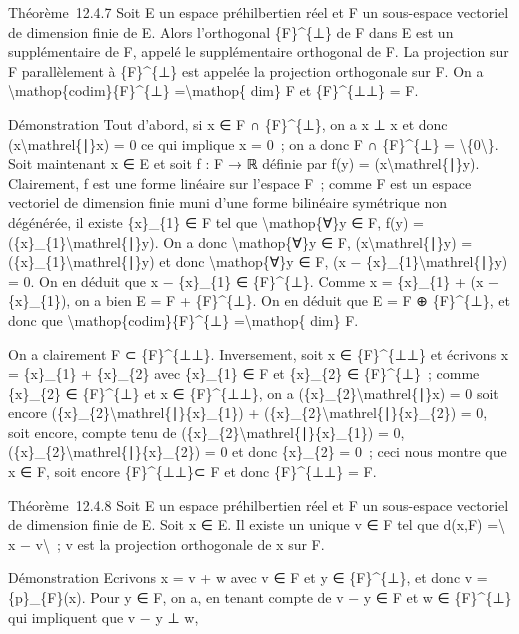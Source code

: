 \documentclass[]{article}
\begin{document}
Théorème~12.4.7 Soit E un espace préhilbertien réel et F un sous-espace
vectoriel de dimension finie de E. Alors l'orthogonal \{F\}\^{}\{⊥\} de
F dans E est un supplémentaire de F, appelé le supplémentaire orthogonal
de F. La projection sur F parallèlement à \{F\}\^{}\{⊥\} est appelée la
projection orthogonale sur F. On a
\textbackslash{}mathop\{codim\}\{F\}\^{}\{⊥\} =\textbackslash{}mathop\{
dim\} F et \{F\}\^{}\{⊥⊥\} = F.

Démonstration Tout d'abord, si x ∈ F ∩ \{F\}\^{}\{⊥\}, on a x ⊥ x et
donc (x\textbackslash{}mathrel\{∣\}x) = 0 ce qui implique x = 0~; on a
donc F ∩ \{F\}\^{}\{⊥\} = \textbackslash{}\{0\textbackslash{}\}. Soit
maintenant x ∈ E et soit f : F → ℝ définie par f(y) =
(x\textbackslash{}mathrel\{∣\}y). Clairement, f est une forme linéaire
sur l'espace F~; comme F est un espace vectoriel de dimension finie muni
d'une forme bilinéaire symétrique non dégénérée, il existe \{x\}\_\{1\}
∈ F tel que \textbackslash{}mathop\{∀\}y ∈ F, f(y) =
(\{x\}\_\{1\}\textbackslash{}mathrel\{∣\}y). On a donc
\textbackslash{}mathop\{∀\}y ∈ F, (x\textbackslash{}mathrel\{∣\}y) =
(\{x\}\_\{1\}\textbackslash{}mathrel\{∣\}y) et donc
\textbackslash{}mathop\{∀\}y ∈ F, (x −
\{x\}\_\{1\}\textbackslash{}mathrel\{∣\}y) = 0. On en déduit que x −
\{x\}\_\{1\} ∈ \{F\}\^{}\{⊥\}. Comme x = \{x\}\_\{1\} + (x −
\{x\}\_\{1\}), on a bien E = F + \{F\}\^{}\{⊥\}. On en déduit que E = F
⊕ \{F\}\^{}\{⊥\}, et donc que
\textbackslash{}mathop\{codim\}\{F\}\^{}\{⊥\} =\textbackslash{}mathop\{
dim\} F.

On a clairement F ⊂ \{F\}\^{}\{⊥⊥\}. Inversement, soit x ∈
\{F\}\^{}\{⊥⊥\} et écrivons x = \{x\}\_\{1\} + \{x\}\_\{2\} avec
\{x\}\_\{1\} ∈ F et \{x\}\_\{2\} ∈ \{F\}\^{}\{⊥\}~; comme \{x\}\_\{2\} ∈
\{F\}\^{}\{⊥\} et x ∈ \{F\}\^{}\{⊥⊥\}, on a
(\{x\}\_\{2\}\textbackslash{}mathrel\{∣\}x) = 0 soit encore
(\{x\}\_\{2\}\textbackslash{}mathrel\{∣\}\{x\}\_\{1\}) +
(\{x\}\_\{2\}\textbackslash{}mathrel\{∣\}\{x\}\_\{2\}) = 0, soit encore,
compte tenu de (\{x\}\_\{2\}\textbackslash{}mathrel\{∣\}\{x\}\_\{1\}) =
0, (\{x\}\_\{2\}\textbackslash{}mathrel\{∣\}\{x\}\_\{2\}) = 0 et donc
\{x\}\_\{2\} = 0~; ceci nous montre que x ∈ F, soit encore
\{F\}\^{}\{⊥⊥\}⊂ F et donc \{F\}\^{}\{⊥⊥\} = F.

Théorème~12.4.8 Soit E un espace préhilbertien réel et F un sous-espace
vectoriel de dimension finie de E. Soit x ∈ E. Il existe un unique v ∈ F
tel que d(x,F) =\textbackslash{}\textbar{} x −
v\textbackslash{}\textbar{}~; v est la projection orthogonale de x sur
F.

Démonstration Ecrivons x = v + w avec v ∈ F et y ∈ \{F\}\^{}\{⊥\}, et
donc v = \{p\}\_\{F\}(x). Pour y ∈ F, on a, en tenant compte de v − y ∈
F et w ∈ \{F\}\^{}\{⊥\} qui impliquent que v − y ⊥ w,
\end{document}
